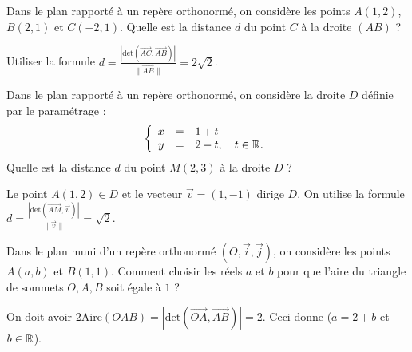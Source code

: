 \begin{question}
Dans le plan rapporté à un repère orthonormé, on considère les points $\displaystyle A(1,2)$, $B(2,1)$ et $C(-2,1)$. Quelle est la distance $d$ du point $C$ à la droite $(AB)$ ?
\begin{answers}  
\end{answers}
\begin{explanations}
Utiliser la formule $\displaystyle d=\frac{\left|\mbox{det}\left(\overrightarrow{AC},\overrightarrow{AB}\right)\right|}{\|\overrightarrow{AB}\|}=2\sqrt{2}$.
\end{explanations}
\end{question}


\begin{question}
Dans le plan rapporté à un repère orthonormé, on considère la droite $D$ d\'efinie par le paramétrage :
$$\left\{\begin{array}{ccl}x&=&1+t\\ y&=&2-t,\quad t\in \mathbb{R}.
\end{array}\right.$$
Quelle est la distance $d$ du point $M(2,3)$ à la droite $D$ ?
\begin{answers}  
\end{answers}
\begin{explanations}
Le point $A(1,2)\in D$ et le vecteur $\vec{v}=(1,-1)$ dirige $D$. On utilise la formule $\displaystyle d=\frac{\left|\mbox{det}\left(\overrightarrow{AM},\vec{v}\right)\right|}{\|\vec{v}\|}=\sqrt{2}$.
\end{explanations}
\end{question}



\begin{question}
Dans le plan muni d'un repère orthonormé $(O,\vec{i},\vec{j})$, on considère les points $\displaystyle A(a,b)$ et $\displaystyle B(1,1)$. Comment choisir les réels $a$ et $b$ pour que l'aire du triangle de sommets $O,A,B$ soit égale à $1$ ?
\begin{answers}  
\end{answers}
\begin{explanations}
On doit avoir $\displaystyle 2\mbox{Aire}(OAB)=\left|\mbox{det}\left(\overrightarrow{OA},\overrightarrow{AB}\right)\right|=2$. Ceci donne ($a=2+b$ et $b\in \mathbb{R}$).
\end{explanations}
\end{question}



